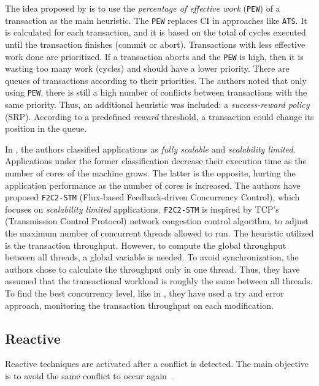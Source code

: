 The idea proposed by  is to use the \emph{percentage of effective work} (\texttt{PEW}) of a transaction as the main heuristic. The \texttt{PEW} replaces CI in approaches like \texttt{ATS}. It is calculated for each transaction, and it is based on the total of cycles executed until the transaction finishes (commit or abort). Transactions with less effective work done are prioritized. If a transaction aborts and the \texttt{PEW} is high, then it is wasting too many work (cycles) and should have a lower priority. There are queues of transactions according to their priorities. The authors noted that only using \texttt{PEW}, there is still a high number of conflicts between transactions with the same priority. Thus, an additional heuristic was included: a \emph{success-reward policy} (SRP). According to a predefined \emph{reward} threshold, a transaction could change its position in the queue. 

In , the authors classified applications as  \emph{fully scalable} and \emph{scalability limited}. Applications under the former classification decrease their execution time as the number of cores of the machine grows. The latter is the opposite, hurting the application performance as the number of cores is increased. The authors have proposed \texttt{F2C2-STM} (Flux-based Feedback-driven Concurrency Control), which focuses on \emph{scalability limited} applications. \texttt{F2C2-STM} is inspired by TCP’s (Transmission Control Protocol) network congestion control algorithm, to adjust the maximum number of concurrent threads allowed to run. The heuristic utilized is the transaction throughput. However, to compute the global throughput between all threads, a global variable is needed. To avoid synchronization, the authors chose to calculate the throughput only in one thread. Thus, they have assumed that the transactional workload is roughly the same between all threads. To find the best concurrency level, like in , they have used a try and error approach, monitoring the transaction throughput on each modification. 

\subsection{Reactive}\label{sec:reactive}

Reactive techniques are activated after a conflict is detected. The main objective is to avoid the same conflict to occur again~\cite{Sanzo:2017}.

